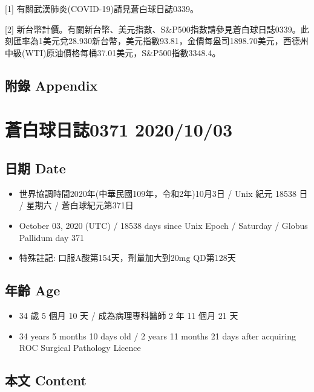 \documentclass[a5paper, 11pt
]{book}
\providecommand{\tightlist}{%
  \setlength{\itemsep}{0pt}\setlength{\parskip}{0pt}}
\begin{document}
{[}1{]} 有關武漢肺炎(COVID-19)請見蒼白球日誌0339。

{[}2{]}
新台幣計價。有關新台幣、美元指數、S\&P500指數請參見蒼白球日誌0339。此刻匯率為1美元兌28.930新台幣，美元指數93.81，金價每盎司1898.70美元，西德州中級(WTI)原油價格每桶37.01美元，S\&P500指數3348.4。

\hypertarget{ux9644ux9304-appendix-29}{%
\subsection{附錄 Appendix}\label{ux9644ux9304-appendix-29}}

\hypertarget{ux84bcux767dux7403ux65e5ux8a8c0371-20201003}{%
\section{蒼白球日誌0371
2020/10/03}\label{ux84bcux767dux7403ux65e5ux8a8c0371-20201003}}

\hypertarget{ux65e5ux671f-date-30}{%
\subsection{日期 Date}\label{ux65e5ux671f-date-30}}

\begin{itemize}
\tightlist
\item
  世界協調時間2020年(中華民國109年，令和2年)10月3日 / Unix 紀元 18538 日
  / 星期六 / 蒼白球紀元第371日
\item
  October 03, 2020 (UTC) / 18538 days since Unix Epoch / Saturday /
  Globus Pallidum day 371
\item
  特殊註記: 口服A酸第154天，劑量加大到20mg QD第128天
\end{itemize}

\hypertarget{ux5e74ux9f61-age-30}{%
\subsection{年齡 Age}\label{ux5e74ux9f61-age-30}}

\begin{itemize}
\tightlist
\item
  34 歲 5 個月 10 天 / 成為病理專科醫師 2 年 11 個月 21 天
\item
  34 years 5 months 10 days old / 2 years 11 months 21 days after
  acquiring ROC Surgical Pathology Licence
\end{itemize}

\hypertarget{ux672cux6587-content-30}{%
\subsection{本文 Content}\label{ux672cux6587-content-30}}
\end{document}

